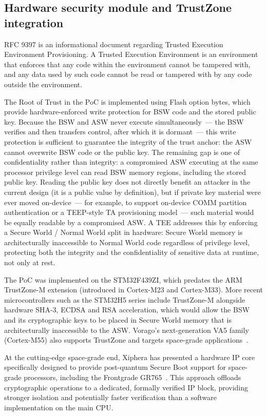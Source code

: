\subsection{Hardware security module and TrustZone integration}
\label{subsection:conclusion-futureWork-HWmodule}

RFC 9397 \cite{rfc9397} is an informational document regarding Trusted Execution Environment Provisioning. A Trusted Execution Environment is an environment that enforces that any code within the environment cannot be tampered with, and any data used by such code cannot be read or tampered with by any code outside the environment.

The Root of Trust in the PoC is implemented using Flash option bytes, which provide hardware-enforced write protection for BSW code and the stored public key. Because the BSW and ASW never execute simultaneously~--- the BSW verifies and then transfers control, after which it is dormant~--- this write protection is sufficient to guarantee the integrity of the trust anchor: the ASW cannot overwrite BSW code or the public key. The remaining gap is one of confidentiality rather than integrity: a compromised ASW executing at the same processor privilege level can read BSW memory regions, including the stored public key. Reading the public key does not directly benefit an attacker in the current design (it is a public value by definition), but if private key material were ever moved on-device~--- for example, to support on-device COMM partition authentication or a TEEP-style TA provisioning model~--- such material would be equally readable by a compromised ASW. A TEE addresses this by enforcing a Secure World / Normal World split in hardware: Secure World memory is architecturally inaccessible to Normal World code regardless of privilege level, protecting both the integrity and the confidentiality of sensitive data at runtime, not only at rest.

The PoC was implemented on the STM32F439ZI, which predates the ARM TrustZone-M extension (introduced in Cortex-M23 and Cortex-M33). More recent microcontrollers such as the STM32H5 series include TrustZone-M alongside hardware SHA-3, ECDSA and RSA acceleration, which would allow the BSW and its cryptographic keys to be placed in Secure World memory that is architecturally inaccessible to the ASW. Vorago's next-generation VA5 family (Cortex-M55) also supports TrustZone and targets space-grade applications~\cite{vorago_va4_satellites}.

At the cutting-edge space-grade end, Xiphera has presented a hardware IP core specifically designed to provide post-quantum Secure Boot support for space-grade processors, including the Frontgrade GR765~\cite{xiphera_pq_secure_boot_2024}. This approach offloads cryptographic operations to a dedicated, formally verified IP block, providing stronger isolation and potentially faster verification than a software implementation on the main CPU.

